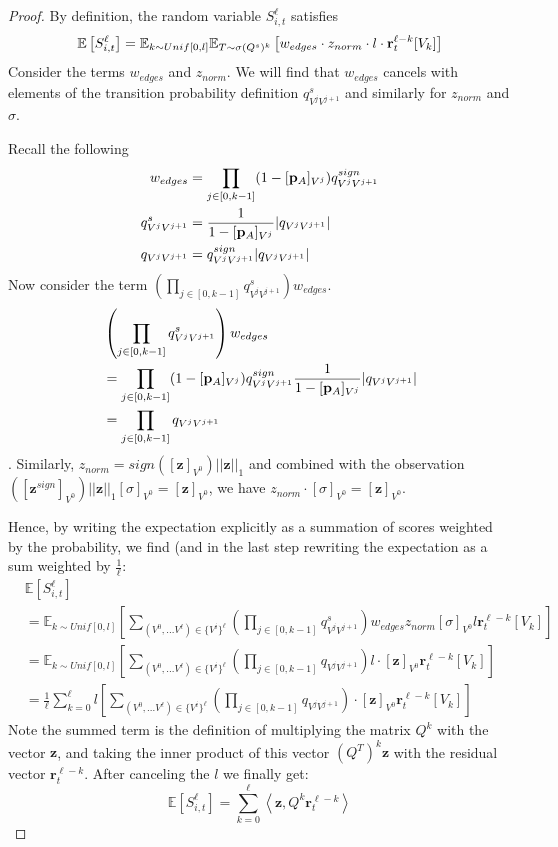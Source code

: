 \begin{proof}
By definition, the random variable $S_{i, t}^{\ell}$ satisfies
\small
$$\mathbb{E}\left[S_{i, t}^{\ell}\right] = \mathbb{E}_{k \sim Unif[0, l]}\mathbb{E}_{T \sim \sigma (Q^s)^k} \left[ w_{edges}\cdot z_{norm} \cdot l \cdot \mathbf{r}^{\ell-k}_t[V_k] \right]$$
\normalsize
Consider the terms $w_{edges}$ and $z_{norm}$. We will find that $w_{edges}$ cancels with elements of the transition probability definition $q^s_{V^jV^{j+1}}$ and similarly for $z_{norm}$ and $\sigma$.
\par Recall the following
\begin{align*}
w_{edges} &=  \prod_{j \in [0, k-1]} (1- [\mathbf{p}_A]_{V^j})q^{sign}_{V^j V^{j+1}} \\
q^s_{V^j V^{j+1}} &= \frac{1}{1- [\mathbf{p}_A]_{V^j}} |q_{V^jV^{j+1}}| \\
q_{V^jV^{j+1}} &= q^{sign}_{V^jV^{j+1}}|q_{V^jV^{j+1}}| \\
\end{align*}
Now consider the term $\left(\prod_{j \in [0, k-1]} q^s_{V^jV^{j+1}} \right) w_{edges}$.
\begin{align*}
 &\left(\prod_{j \in [0, k-1]} q^s_{V^jV^{j+1}} \right) w_{edges} \\
 &= \prod_{j \in [0, k-1]} (1- [\mathbf{p}_A]_{V^j})q^{sign}_{V^j V^{j+1}} \frac{1}{1-[\mathbf{p}_A]_{V^j}} |q_{V^jV^{j+1}}| \\
 &= \prod_{j \in [0, k-1]} q_{V^jV^{j+1}}
\end{align*}.
Similarly, $z_{norm} = sign([\mathbf{z}]_{V^0})||\mathbf{z}||_1$ and combined with the observation $\left([\mathbf{z}^{sign}]_{V^0} \right) ||\mathbf{z}||_1 [\sigma]_{V^0} = [\mathbf{z}]_{V^0}$, we have $z_{norm} \cdot [\sigma]_{V^0} = [\mathbf{z}]_{V^0}$.
\par Hence, by writing the expectation explicitly as a summation of scores weighted by the probability, we find (and in the last step rewriting the expectation as a sum weighted by $\frac{1}{\ell}$:
\small
\begin{align*}
&\mathbb{E}\left[S_{i, t}^{\ell} \right] \\
&= \mathbb{E}_{k \sim Unif[0, l]} \left[\sum_{(V^0,... V^{\ell}) \in \{V^i\}^{\ell}} \left(\prod_{j \in [0, k-1]} q^s_{V^jV^{j+1}} \right) w_{edges} z_{norm} [\sigma]_{V^0} l  \mathbf{r}_t^{\ell-k}[V_k]\right] \\
&= 
\mathbb{E}_{k \sim Unif[0, l]} \left[\sum_{(V^0,... V^{\ell}) \in \{V^i\}^{\ell}} \left(\prod_{j \in [0, k-1]} q_{V^jV^{j+1}} \right)  l \cdot [\mathbf{z}]_{V^0} \mathbf{r}_t^{\ell-k}[V_k] \right]  \\
&=
\frac{1}{\ell} \sum_{k=0}^{\ell} l \left[ \sum_{(V^0,... V^{\ell}) \in \{V^i\}^{\ell}}\left(\prod_{j \in [0, k-1]} q_{V^jV^{j+1}} \right)\cdot [\mathbf{z}]_{V^0} \mathbf{r}_t^{\ell-k}[V_k] \right] 
\end{align*}
\normalsize
Note  the summed term is the definition of multiplying the matrix $Q^k$ with the vector $\mathbf{z}$, and taking the inner product of this vector $(Q^T)^k\mathbf{z}$ with the residual vector $\mathbf{r}_t^{\ell-k}$.
After canceling the $l$ we finally get:
$$\mathbb{E}\left[S_{i, t}^{\ell}\right] = \sum_{k=0}^{\ell} \left<\mathbf{z}, Q^k\mathbf{r}_t^{\ell-k} \right>$$
\end{proof}

